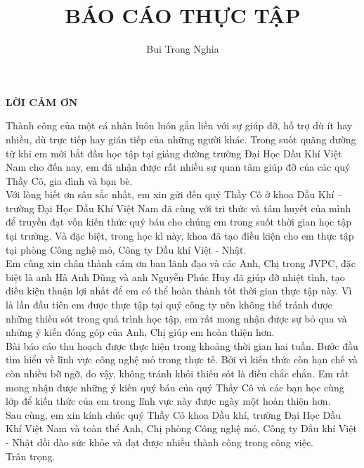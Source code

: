 \documentclass[12pt,a4paper]{report}
\title{\textbf{BÁO CÁO THỰC TẬP}}
\author{Bui Trong Nghia}
\begin{document}
\thispagestyle{empty}
\clearpage


\maketitle
\newpage

\begin{center}
	\centering
    \textbf{LỜI CẢM ƠN}
\end{center}
Thành công của một cá nhân luôn luôn gắn liền với sự giúp đỡ, hỗ trợ dù ít hay nhiều, dù trực tiếp hay gián tiếp của những người khác. Trong suốt quãng đường từ khi em mới bắt đầu học tập tại giảng đường trường Đại Học Dầu Khí Việt Nam cho đến nay, em đã nhận được rất nhiều sự quan tâm giúp đỡ của các quý Thầy Cô, gia đình và bạn bè.\\
Với lòng biết ơn sâu sắc nhất, em xin gửi đến quý Thầy Cô ở khoa Dầu Khí – trường Đại Học Dầu Khí Việt Nam đã cùng với tri thức và tâm huyết của mình để truyền đạt vốn kiến thức quý báu cho chúng em trong suốt thời gian học tập tại trường. Và đặc biệt, trong học kì này, khoa đã tạo điều kiện cho em thực tập tại phòng Công nghệ mỏ, Công ty Dầu khí Việt - Nhật.\\
Em cũng xin chân thành cám ơn ban lãnh đạo và các Anh, Chị trong JVPC, đặc biệt là anh Hà Anh Dũng và anh Nguyễn Phúc Huy đã giúp đỡ nhiệt tình, tạo điều kiện thuận lợi nhất để em có thể hoàn thành tốt thời gian thực tập này. Vì là lần đầu tiên em được thực tập tại quý công ty nên không thể tránh được những thiếu sót trong quá trình học tập, em rất mong nhận được sự bỏ qua và những ý kiến đóng góp của Anh, Chị giúp em hoàn thiện hơn.\\
Bài báo cáo thu hoạch được thực hiện trong khoảng thời gian hai tuần. Bước đầu tìm hiểu về lĩnh vực công nghệ mỏ trong thực tế. Bởi vì kiến thức còn hạn chế và còn nhiều bỡ ngỡ, do vậy, không tránh khỏi thiếu sót là điều chắc chắn. Em rất mong nhận được những ý kiến quý báu của quý Thầy Cô và các bạn học cùng lớp để kiến thức của em trong lĩnh vực này được ngày một hoàn thiện hơn.\\
Sau cùng, em xin kính chúc quý Thầy Cô khoa Dầu khí, trường Đại Học Dầu Khí Việt Nam và toàn thể Anh, Chị phòng Công nghệ mỏ, Công ty Dầu khí Việt - Nhật dồi dào sức khỏe và đạt được nhiều thành công trong công việc.\\
Trân trọng.

\newpage
\tableofcontents
\listoffigures
\clearpage
{}
\newpage
\end{document}
